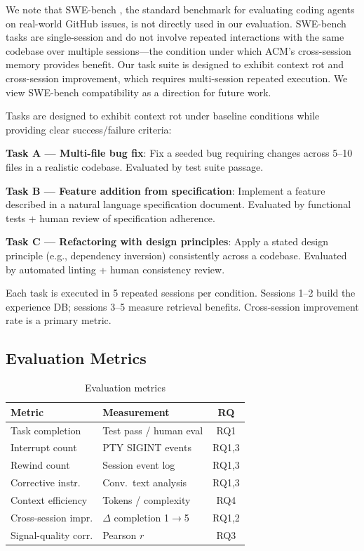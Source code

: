 \documentclass[conference]{IEEEtran}
\begin{document}
We note that SWE-bench \cite{Jimenez2024SWEbench}, the standard benchmark for evaluating coding agents on real-world GitHub issues, is not directly used in our evaluation. SWE-bench tasks are single-session and do not involve repeated interactions with the same codebase over multiple sessions---the condition under which ACM's cross-session memory provides benefit. Our task suite is designed to exhibit context rot and cross-session improvement, which requires multi-session repeated execution. We view SWE-bench compatibility as a direction for future work.

Tasks are designed to exhibit context rot under baseline conditions while providing clear success/failure criteria:

\textbf{Task A --- Multi-file bug fix}: Fix a seeded bug requiring changes across 5--10 files in a realistic codebase. Evaluated by test suite passage.

\textbf{Task B --- Feature addition from specification}: Implement a feature described in a natural language specification document. Evaluated by functional tests + human review of specification adherence.

\textbf{Task C --- Refactoring with design principles}: Apply a stated design principle (e.g., dependency inversion) consistently across a codebase. Evaluated by automated linting + human consistency review.

Each task is executed in 5 repeated sessions per condition. Sessions 1--2 build the experience DB; sessions 3--5 measure retrieval benefits. Cross-session improvement rate is a primary metric.

\subsection{Evaluation Metrics}

\begin{table}[h]
\centering
\caption{Evaluation metrics}
\label{tab:metrics}
\small
\begin{tabular}{p{2.5cm}p{2.5cm}c}
\toprule
\textbf{Metric} & \textbf{Measurement} & \textbf{RQ} \\
\midrule
Task completion & Test pass / human eval & RQ1 \\
Interrupt count & PTY SIGINT events & RQ1,3 \\
Rewind count & Session event log & RQ1,3 \\
Corrective instr. & Conv.\ text analysis & RQ1,3 \\
Context efficiency & Tokens / complexity & RQ4 \\
Cross-session impr. & $\Delta$ completion 1$\rightarrow$5 & RQ1,2 \\
Signal-quality corr. & Pearson $r$ & RQ3 \\
\bottomrule
\end{tabular}
\end{table}
\end{document}

